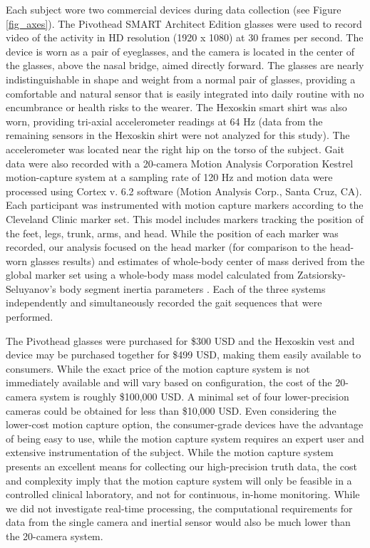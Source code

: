 \documentclass[12pt]{report}
\begin{document}
Each subject wore two commercial devices during data collection (see Figure \ref{fig_axes}). The Pivothead SMART Architect Edition glasses \cite{Pivothead2017Pivothead} were used to record video of the activity in HD resolution (1920 x 1080) at 30 frames per second. The device is worn as a pair of eyeglasses, and the camera is located in the center of the glasses, above the nasal bridge, aimed directly forward. The glasses are nearly indistinguishable in shape and weight from a normal pair of glasses, providing a comfortable and natural sensor that is easily integrated into daily routine with no encumbrance or health risks to the wearer. The Hexoskin smart shirt \cite{CarreTechnologies2017HexoskinShirts, Banerjee2017ValidatingManagement} was also worn, providing tri-axial accelerometer readings at 64 Hz (data from the remaining sensors in the Hexoskin shirt were not analyzed for this study). The accelerometer was located near the right hip on the torso of the subject. Gait data were also recorded with a 20-camera Motion Analysis Corporation Kestrel motion-capture system at a sampling rate of 120 Hz and motion data were processed using Cortex v. 6.2 software (Motion Analysis Corp., Santa Cruz, CA). Each participant was instrumented with motion capture markers according to the Cleveland Clinic marker set. This model includes markers tracking the position of the feet, legs, trunk, arms, and head. While the position of each marker was recorded, our analysis focused on the head marker (for comparison to the head-worn glasses results) and estimates of whole-body center of mass derived from the global marker set using a whole-body mass model calculated from Zatsiorsky-Seluyanov's body segment inertia parameters \cite{deLeva1996AdjustmentsParameters}. Each of the three systems independently and simultaneously recorded the gait sequences that were performed.

The Pivothead glasses were purchased for \$300 USD and the Hexoskin vest and device may be purchased together for \$499 USD, making them easily available to consumers. While the exact price of the motion capture system is not immediately available and will vary based on configuration, the cost of the 20-camera system is roughly \$100,000 USD. A minimal set of four lower-precision cameras could be obtained for less than \$10,000 USD. Even considering the lower-cost motion capture option, the consumer-grade devices have the advantage of being easy to use, while the motion capture system requires an expert user and extensive instrumentation of the subject. While the motion capture system presents an excellent means for collecting our high-precision truth data, the cost and complexity imply that the motion capture system will only be feasible in a controlled clinical laboratory, and not for continuous, in-home monitoring. While we did not investigate real-time processing, the computational requirements for data from the single camera and inertial sensor would also be much lower than the 20-camera system.
\end{document}

